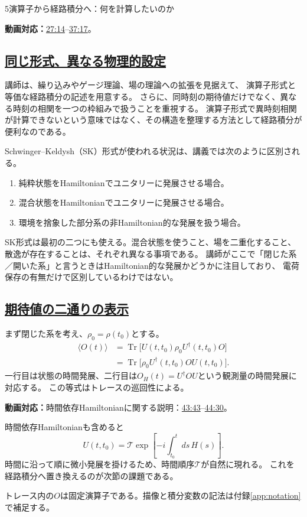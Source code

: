 \documentclass[a4paper,11pt]{ltjsarticle}
\newcommand{\subsectionlink}[1]{\subsection[#1]{\hyperlink{toc}{#1}}}
\numberwithin{equation}{section}
\newcommand{\Tr}{\operatorname{Tr}}
\newcommand{\av}[1]{\langle #1\rangle}
\newcommand{\video}[2]{\href{https://www.youtube.com/watch?v=RYxzcUhIHjk\&t=#1s}{#2}}
\newcommand{\videosource}[1]{\par\noindent\textcolor{noteblue}{\textbf{動画対応：}#1}\par\smallskip}
\begin{document}
\begin{lecturesection}{5}{演算子から経路積分へ：何を計算したいのか}
\label{sec:motivation}
\videosource{\video{1634}{27:14}--\video{2237}{37:17}。}
\subsectionlink{同じ形式、異なる物理的設定}
講師は、繰り込みやゲージ理論、場の理論への拡張を見据えて、
演算子形式と等価な経路積分の記述を用意する。
さらに、同時刻の期待値だけでなく、異なる時刻の相関を一つの枠組みで扱うことを重視する。
演算子形式で異時刻相関が計算できないという意味ではなく、その構造を整理する方法として経路積分が便利なのである。

Schwinger--Keldysh（SK）形式が使われる状況は、講義では次のように区別される。
\begin{enumerate}
 \item 純粋状態をHamiltonianでユニタリーに発展させる場合。
 \item 混合状態をHamiltonianでユニタリーに発展させる場合。
 \item 環境を捨象した部分系の非Hamiltonian的な発展を扱う場合。
\end{enumerate}
SK形式は最初の二つにも使える。混合状態を使うこと、場を二重化すること、
散逸が存在することは、それぞれ異なる事項である。
講師がここで「閉じた系／開いた系」と言うときはHamiltonian的な発展かどうかに注目しており、
電荷保存の有無だけで区別しているわけではない。

\subsectionlink{期待値の二通りの表示}
まず閉じた系を考え、$\rho_0=\rho(t_0)$とする。
\begin{align}
 \av{O(t)}
   &=\Tr\bigl[U(t,t_0)\rho_0U^\dagger(t,t_0)O\bigr]\\
   &=\Tr\bigl[\rho_0U^\dagger(t,t_0)O U(t,t_0)\bigr].
 \label{eq:trace}
\end{align}
一行目は状態の時間発展、二行目は$O_H(t)=U^\dagger O U$という観測量の時間発展に対応する。
この等式はトレースの巡回性による。
\videosource{時間依存Hamiltonianに関する説明：\video{2623}{43:43}--\video{2670}{44:30}。}
時間依存Hamiltonianも含めると
\begin{equation}
 U(t,t_0)=\mathcal T\exp\left[-i\int_{t_0}^t ds\,H(s)\right].
\end{equation}
時間に沿って順に微小発展を掛けるため、時間順序$\mathcal T$が自然に現れる。
これを経路積分へ置き換えるのが次節の課題である。

トレース内の$O$は固定演算子である。描像と積分変数の記法は付録\ref{app:notation}で補足する。

\end{lecturesection}
\end{document}
